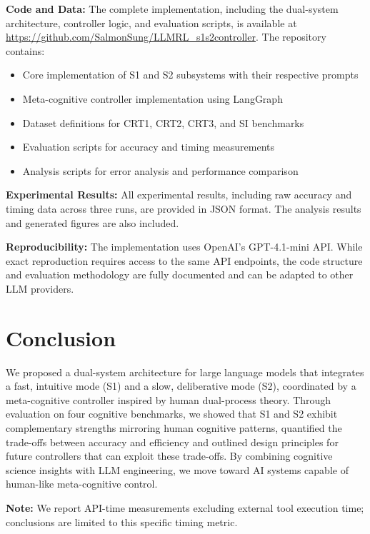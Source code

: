 \documentclass[11pt]{article}
\begin{document}
\textbf{Code and Data:} The complete implementation, including the dual-system architecture, controller logic, and evaluation scripts, is available at \url{https://github.com/SalmonSung/LLMRL_s1s2controller}. The repository contains:
\begin{itemize}
\item Core implementation of S1 and S2 subsystems with their respective prompts
\item Meta-cognitive controller implementation using LangGraph
\item Dataset definitions for CRT1, CRT2, CRT3, and SI benchmarks
\item Evaluation scripts for accuracy and timing measurements
\item Analysis scripts for error analysis and performance comparison
\end{itemize}

\textbf{Experimental Results:} All experimental results, including raw accuracy and timing data across three runs, are provided in JSON format. The analysis results and generated figures are also included.

\textbf{Reproducibility:} The implementation uses OpenAI's GPT-4.1-mini API. While exact reproduction requires access to the same API endpoints, the code structure and evaluation methodology are fully documented and can be adapted to other LLM providers.

\section{Conclusion}
We proposed a dual-system architecture for large language models that
integrates a fast, intuitive mode (S1) and a slow, deliberative mode (S2),
coordinated by a meta-cognitive controller inspired by human dual-process
theory.  Through evaluation on four cognitive benchmarks, we showed that S1
and S2 exhibit complementary strengths mirroring human cognitive patterns,
quantified the trade-offs between accuracy and efficiency and outlined
design principles for future controllers that can exploit these trade-offs.
By combining cognitive science insights with LLM engineering, we move
toward AI systems capable of human-like meta-cognitive control.

\textbf{Note:} We report API-time measurements excluding external tool execution time; conclusions are limited to this specific timing metric.



\end{document}
